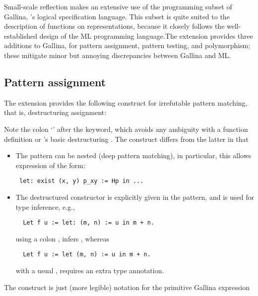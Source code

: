 Small-scale reflection makes an extensive use of the programming
subset of Gallina, \Coq{}'s logical specification language. This subset
is quite suited to the description of functions on representations,
because it closely follows the well-established design of the ML
programming language.The \ssr{} extension provides three additions
to Gallina, for pattern assignment, pattern testing, and polymorphism;
these mitigate minor but annoying discrepancies between Gallina and ML.

\subsection{Pattern assignment}\label{ssec:patass}
The \ssr{} extension provides the following construct for
irrefutable pattern matching, that is, destructuring assignment:

   \ssrC{:=}   

Note the colon `\ssrC{:}' after the  keyword, which avoids any
ambiguity with a function
definition or \Coq{}'s basic destructuring . The 
construct differs from the latter in that
\begin{itemize}
\item The pattern can be nested (deep pattern matching), in
  particular, this allows expression of the form:
\begin{lstlisting}
 let: exist (x, y) p_xy := Hp in ...
\end{lstlisting}
\item The destructured constructor is explicitly given in the
  pattern, and is used for type inference, e.g.,
\begin{lstlisting}
  Let f u := let: (m, n) := u in m + n.
\end{lstlisting}
using a colon , infers , whereas
\begin{lstlisting}
  Let f u := let (m, n) := u in m + n.
\end{lstlisting}
with a usual , requires an extra type annotation.
\end{itemize}
The  construct is just (more legible) notation for the primitive Gallina expression

\begin{center}
    \ssrC{=>}  
\end{center}


